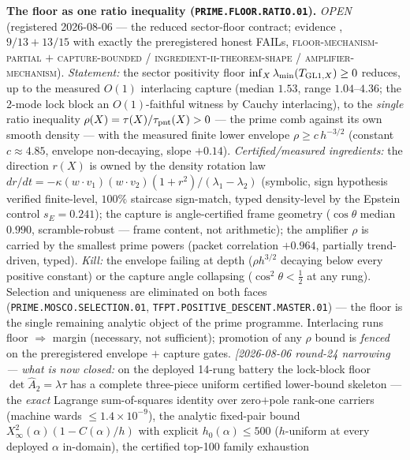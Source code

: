 \documentclass[11pt,a4paper]{article}
\begin{document}
\par\smallskip\noindent\textbf{The floor as one ratio inequality
(\texttt{PRIME.FLOOR.RATIO.01}).}
{\sloppy
\emph{OPEN} (registered 2026-08-06 --- the reduced sector-floor
contract; evidence , $9/13 +
13/15$ with exactly the preregistered honest FAILs,
\textsc{floor-mechanism-partial} $+$ \textsc{capture-bounded} /
\textsc{ingredient-ii-theorem-shape} /
\textsc{amplifier-mechanism}).  \emph{Statement:} the sector
positivity floor $\inf_X\lambda_{\min}(T_{{\rm GL1},X})\ge0$
reduces, up to the measured $O(1)$ interlacing capture (median
$1.53$, range $1.04$--$4.36$; the 2-mode lock block an
$O(1)$-faithful witness by Cauchy interlacing), to the
\emph{single} ratio inequality
$\rho(X)=\tau(X)/\tau_{\rm pnt}(X)>0$ --- the prime comb against
its own smooth density --- with the measured finite lower
envelope $\rho\ge c\,h^{-3/2}$ (constant $c\approx4.85$, envelope
non-decaying, slope $+0.14$).  \emph{Certified/measured
ingredients:} the direction $r(X)$ is owned by the density
rotation law $dr/dt=-\kappa(w\!\cdot\!v_1)(w\!\cdot\!v_2)
(1+r^2)/(\lambda_1-\lambda_2)$ (symbolic, sign hypothesis
verified finite-level, $100\%$ staircase sign-match, typed
density-level by the Epstein control $s_E=0.241$); the capture is
angle-certified frame geometry ($\cos\theta$ median $0.990$,
scramble-robust --- frame content, not arithmetic); the amplifier
$\rho$ is carried by the smallest prime powers (packet
correlation $+0.964$, partially trend-driven, typed).
\emph{Kill:} the envelope failing at depth ($\rho h^{3/2}$
decaying below every positive constant) or the capture angle
collapsing ($\cos^2\theta<\tfrac12$ at any rung).  Selection and
uniqueness are eliminated on both faces
(\texttt{PRIME.MOSCO.SELECTION.01},
\texttt{TFPT.POSITIVE\_DESCENT.MASTER.01}) --- the floor is the
single remaining analytic object of the prime programme.
Interlacing runs floor $\Rightarrow$ margin (necessary, not
sufficient); promotion of any $\rho$ bound is
\emph{fenced} on the preregistered envelope $+$ capture gates.
\emph{[2026-08-06 round-24 narrowing --- what is now closed:} on
the deployed 14-rung battery the lock-block floor $\det\hat A_2 =
\lambda\tau$ has a complete three-piece uniform certified
lower-bound skeleton --- the \emph{exact} Lagrange sum-of-squares
identity over zero$+$pole rank-one carriers (machine wards
$\le1.4\times10^{-9}$), the analytic fixed-pair bound
$X_\infty^2(\alpha)(1 - C(\alpha)/h)$ with explicit
$h_0(\alpha)\le500$ ($h$-uniform at every deployed $\alpha$
in-domain), the certified top-100 family exhaustion
}
\end{document}
